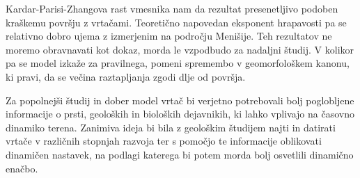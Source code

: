 \documentclass[a4paper, oneside, 12pt]{book}
\begin{document}
Kardar-Parisi-Zhangova rast vmesnika nam da rezultat presenetljivo podoben kraškemu površju z vrtačami. Teoretično napovedan eksponent hrapavosti pa se relativno dobro ujema z izmerjenim na področju Menišije. Teh rezultatov ne moremo obravnavati kot dokaz, morda le vzpodbudo za nadaljni študij. V kolikor pa se model izkaže za pravilnega, pomeni spremembo v geomorfološkem kanonu, ki pravi, da se večina raztapljanja zgodi dlje od površja.

Za popolnejši študij in dober model vrtač bi verjetno potrebovali bolj poglobljene informacije o prsti, geoloških in bioloških dejavnikih, ki lahko vplivajo na časovno dinamiko terena. Zanimiva ideja bi bila z geološkim študijem najti in datirati vrtače v različnih stopnjah razvoja ter s pomočjo te informacije oblikovati dinamičen nastavek, na podlagi katerega bi potem morda bolj osvetlili dinamično enačbo.

            \nocite{*}
            \newpage
            {}
            


            
\end{document}

